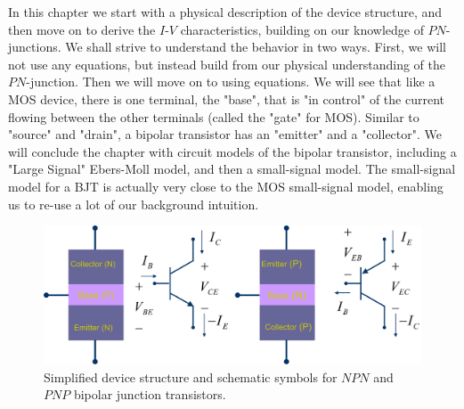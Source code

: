In this chapter we start with a physical description of the device structure, and then move on to derive the $I$-$V$ characteristics, building on our knowledge of $PN$-junctions. We shall strive to understand the behavior in two ways.  First, we will not use any equations, but instead build from our physical understanding of the $PN$-junction.  Then we will move on to using equations.  We will see that like a MOS device, there is one terminal, the "base", that is "in control" of the current flowing between the other terminals (called the "gate" for MOS).  Similar to "source" and "drain", a bipolar transistor has an "emitter" and a "collector".
We will conclude the chapter with circuit models of the bipolar transistor, including a "Large Signal" Ebers-Moll model, and then a small-signal model.  The small-signal model for a BJT is actually very close to the MOS small-signal model, enabling us to re-use a lot of our background intuition.
\newpage
\begin{figure}[t]
\centering
\includegraphics[width=\columnwidth]{slide2_bjt_overview}
\caption{Simplified device structure and schematic symbols for $NPN$ and $PNP$ bipolar junction transistors.}
\label{fig:slide2_bjt_overview}
\end{figure}
